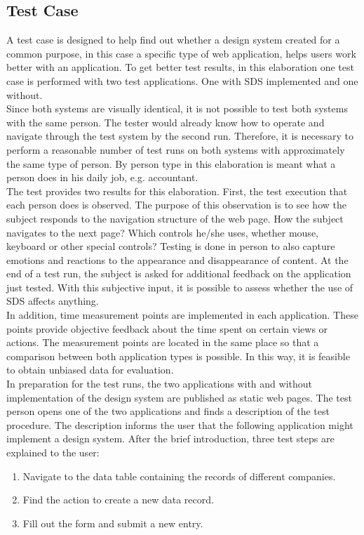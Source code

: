 \subsection{Test Case}
A test case is designed to help find out whether a design system created for a common purpose, in this case a specific type of web application, helps users work better with an application. To get better test results, in this elaboration one test case is performed with two test applications. One with SDS implemented and one without. \\
Since both systems are visually identical, it is not possible to test both systems with the same person. The tester would already know how to operate and navigate through the test system by the second run. Therefore, it is necessary to perform a reasonable number of test runs on both systems with approximately the same type of person. By person type in this elaboration is meant what a person does in his daily job, e.g. accountant.  \\
The test provides two results for this elaboration. First, the test execution that each person does is observed. The purpose of this observation is to see how the subject responds to the navigation structure of the web page. How the subject navigates to the next page? Which controls he/she uses, whether mouse, keyboard or other special controls? Testing is done in person to also capture emotions and reactions to the appearance and disappearance of content. At the end of a test run, the subject is asked for additional feedback on the application just tested. With this subjective input, it is possible to assess whether the use of \ac{SDS} affects anything. \\
In addition, time measurement points are implemented in each application. These points provide objective feedback about the time spent on certain views or actions. The measurement points are located in the same place so that a comparison between both application types is possible.  In this way, it is feasible to obtain unbiased data for evaluation. \\
In preparation for the test runs, the two applications with and without implementation of the design system are published as static web pages. The test person opens one of the two applications and finds a description of the test procedure. The description informs the user that the following application might implement a design system. After the brief introduction, three test steps are explained to the user:

\begin{enumerate}
    \item Navigate to the data table containing the records of different companies.
    \item Find the action to create a new data record.
    \item Fill out the form and submit a new entry.
\end{enumerate}


